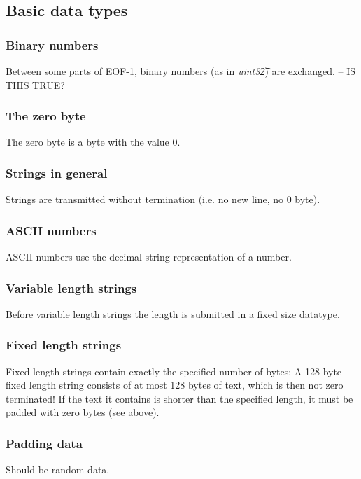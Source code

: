 \documentclass[12pt,a4paper]{book}
\begin{document}
\subsection{Basic data types}
\subsubsection{Binary numbers}
Between some parts of EOF-1, binary numbers (as in \textit{uint32\t})
are exchanged. -- IS THIS TRUE?
\subsubsection{The zero byte}
The zero byte is a byte with the value 0.
\subsubsection{Strings in general}
Strings are transmitted without termination (i.e. no new line, no 0 byte).
\subsubsection{ASCII numbers}
ASCII numbers use the decimal string representation of a number.
\subsubsection{Variable length strings}
Before variable length strings the length is submitted in a fixed size
datatype.
\subsubsection{Fixed length strings}
Fixed length strings contain exactly the specified number of bytes:
A 128-byte fixed length string consists of at most 128 bytes of text,
which is then not zero terminated!
If the text it contains is shorter than the specified length,
it must be padded with zero bytes (see above).
\subsubsection{Padding data}
Should be random data.
\end{document}
